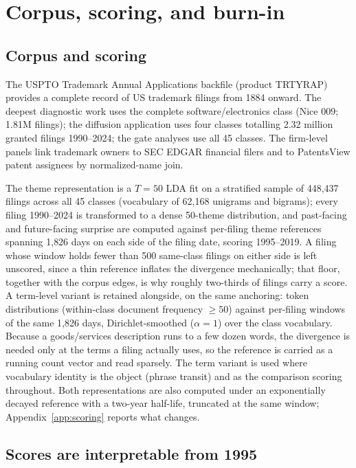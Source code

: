 \section{Corpus, scoring, and burn-in}\label{app:comp}

\subsection{Corpus and scoring}

The USPTO Trademark Annual Applications backfile (product TRTYRAP)
provides a complete record of US trademark filings from 1884 onward. The
deepest diagnostic work uses the complete software/electronics class
(Nice 009; 1.81M filings); the diffusion application uses four classes
totalling 2.32 million granted filings 1990--2024; the gate analyses use
all 45 classes. The firm-level panels link trademark owners to SEC EDGAR
financial filers and to PatentsView patent assignees by normalized-name
join.

The theme representation is a $T = 50$ LDA fit on a stratified sample of
448{,}437 filings across all 45 classes (vocabulary of 62{,}168 unigrams
and bigrams); every filing 1990--2024 is transformed to a dense 50-theme
distribution, and past-facing and future-facing surprise are computed against
per-filing theme references spanning 1{,}826 days on each side of the filing
date, scoring 1995--2019. A filing whose window holds fewer than 500
same-class filings on either side is left unscored, since a thin reference
inflates the divergence mechanically; that floor, together with the corpus
edges, is why roughly two-thirds of filings carry a score. A term-level variant is retained
alongside, on the same anchoring: token distributions (within-class
document frequency $\geq 50$) against per-filing windows of the same
1{,}826 days, Dirichlet-smoothed ($\alpha = 1$) over the class vocabulary.
Because a goods/services description runs to a few dozen words, the
divergence is needed only at the terms a filing actually uses, so the
reference is carried as a running count vector and read sparsely. The term
variant is used where vocabulary identity is the object (phrase transit)
and as the comparison scoring throughout. Both representations are also computed under an
exponentially decayed reference with a two-year half-life, truncated at the
same window; Appendix~\ref{app:scoring} reports what changes.

\subsection{Scores are interpretable from 1995}

